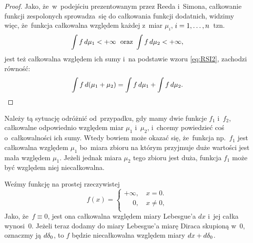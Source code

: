 \documentclass[a4paper,11pt]{article}
\begin{document}
\begin{proof}
  Jako, że~w~podejściu prezentowanym przez Reeda i~Simona, całkowanie
  funkcji zespolonych sprowadza~się do całkowania funkcji dodatnich,
  widzimy więc, że~funkcja całkowalna względem każdej z~miar
  $\mu_{ i }$, $i = 1, \ldots, n$~tzn.
  \begin{align*}
    \int\limits  f  \, d \mu_{ 1 }  < +\infty \;\textrm{  oraz  }
    \int\limits  f  \, d \mu_{ 2 }  < +\infty,
  \end{align*}
  jest też całkowalna względem ich sumy i~na podstawie wzoru
  \eqref{eq:RSI2}, zachodzi równość:
  \begin{equation}
    \label{eq:RSI3}
    \int\limits  f  \, d ( \mu_{ 1 } + \mu_{ 2 } )  = \int\limits  f  \, d \mu_{ 1 } 
    + \int\limits  f  \, d \mu_{ 2 } .
  \end{equation}

\end{proof}


 Należy tą sytuację odróżnić od~przypadku, gdy mamy dwie
funkcje $f_{ 1 }$ i~$f_{ 2 }$, całkowalne odpowiednio względem miar
$\mu_{ 1 }$ i~$\mu_{ 2 }$, i~chcemy powiedzieć coś o~całkowalności ich
sumy. Wtedy bowiem może okazać się, że~funkcja np.~$f_{ 1 }$ jest
całkowalna względem $\mu_{ 1 }$ bo~miara zbioru na którym przyjmuje
duże wartości jest mała względem $\mu_{ 1 }$. Jeżeli jednak miara
$\mu_{ 2 }$ tego zbioru jest duża, funkcja $f_{ 1 }$ może być względem
niej niecałkowalna.

 Weźmy funkcję na prostej rzeczywistej
\begin{equation*}
  f( x ) =
  \begin{cases}
    +\infty, \quad x = 0. \\
    \quad \;0, \quad x \neq 0, \\
  \end{cases}
\end{equation*}
Jako, że~$f \equiv 0$, jest ona całkowalna względem miary Lebesgue'a
$dx$ i~jej całka wynosi~0. Jeżeli teraz dodamy do miary Lebesgue'a
miarę Diraca skupioną w~0, oznaczmy ją $d\delta_{ 0 }$, to $f$ będzie
niecałkowalna względem miary $dx + d\delta_{ 0 }$. %

\vspace{\spaceThree}



\noi {}

\vspace{\spaceFour}
\end{document}
